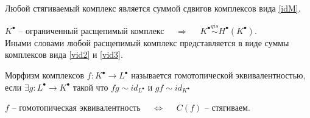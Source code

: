 \documentclass[../main.tex]{subfiles}
\begin{document}
\begin{to_suj}
Любой стягиваемый комплекс является суммой сдвигов комплексов вида \ref{idM}. 
\end{to_suj}
\begin{to_suj}\label{split1}
$K^\bullet$ -- ограниченный расщепимый комплекс $\quad \Rightarrow \quad$ $K^\bullet\overset{qis}{\sim}H^\bullet(K^\bullet)$. \\
Иными словами любой расщепимый комплекс представляется в виде суммы комплексов вида \ref{vid2} и \ref{vid3}.
\end{to_suj}
\begin{to_def}
    Морфизм комплексов $f\colon K^\bullet \to L^\bullet$ называется гомотопической эквивалентностью, если $\exists g\colon L^\bullet \to K^\bullet$ такой что $fg \sim id_{L^\bullet}$ и $gf\sim id_{K^\bullet}$
\end{to_def}
\begin{to_suj}
\label{hom_eq_con}
 $f$ -- гомотопическая эквивалентность $\quad \Leftrightarrow \quad$ $C(f)$ -- стягиваем.
\end{to_suj}%
\end{document}
